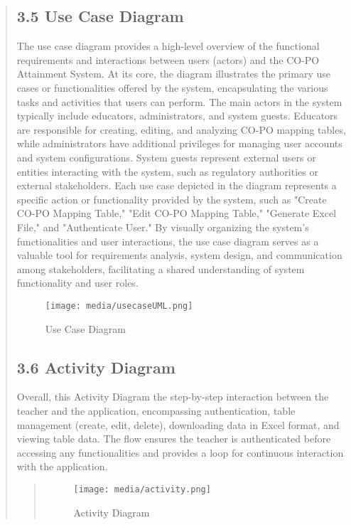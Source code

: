 \documentclass[12pt]{report}
\begin{document}
\begin{quote}
		\subsection{3.5 Use Case Diagram}
		\hspace{1cm}The use case diagram provides a high-level overview of the functional requirements and interactions between users (actors) and the CO-PO Attainment System. At its core, the diagram illustrates the primary use cases or functionalities offered by the system, encapsulating the various tasks and activities that users can perform. The main actors in the system typically include educators, administrators, and system guests. Educators are responsible for creating, editing, and analyzing CO-PO mapping tables, while administrators have additional privileges for managing user accounts and system configurations. System guests represent external users or entities interacting with the system, such as regulatory authorities or external stakeholders. Each use case depicted in the diagram represents a specific action or functionality provided by the system, such as "Create CO-PO Mapping Table," "Edit CO-PO Mapping Table," "Generate Excel File," and "Authenticate User." By visually organizing the system's functionalities and user interactions, the use case diagram serves as a valuable tool for requirements analysis, system design, and communication among stakeholders, facilitating a shared understanding of system functionality and user roles.
		\\[13ex]
		\begin{figure}
			\centering
			\texttt{[image: media/usecaseUML.png]}\\
			\caption{Use Case Diagram}
		\end{figure}
		
		\subsection{3.6 Activity Diagram}
		\hspace{1cm}Overall, this Activity Diagram the step-by-step interaction between the teacher and the application, encompassing authentication, table management (create, edit, delete), downloading data in Excel format, and viewing table data. The flow ensures the teacher is authenticated before accessing any functionalities and provides a loop for continuous interaction with the application.\\
		
		\begin{quote}
			\begin{figure}
				\centering
				\texttt{[image: media/activity.png]}\\
				\caption{Activity Diagram}
			\end{figure}
		\end{quote}
		

\end{quote}
\end{document}
